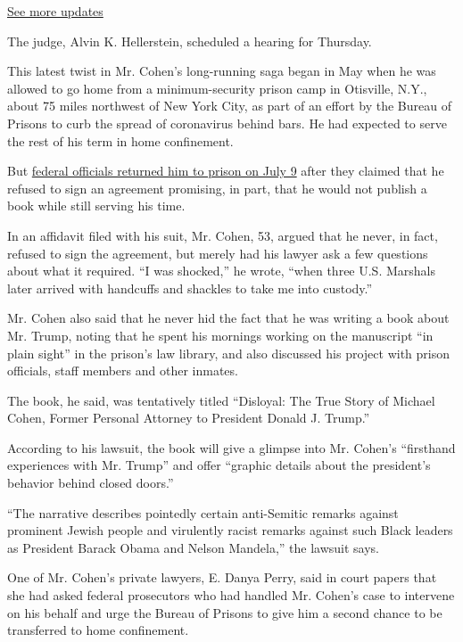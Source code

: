 \href{https://www.nytimes3xbfgragh.onion/2020/08/03/us/elections/biden-vs-trump.html?action=click\&pgtype=Article\&state=default\&region=MAIN_CONTENT_1\&context=storylines_live_updates}{See
more updates}

The judge, Alvin K. Hellerstein, scheduled a hearing for Thursday.

This latest twist in Mr. Cohen's long-running saga began in May when he
was allowed to go home from a minimum-security prison camp in Otisville,
N.Y., about 75 miles northwest of New York City, as part of an effort by
the Bureau of Prisons to curb the spread of coronavirus behind bars. He
had expected to serve the rest of his term in home confinement.

But
\href{https://www.nytimes3xbfgragh.onion/2020/07/09/nyregion/michael-cohen-arrested.html}{federal
officials returned him to prison on July 9} after they claimed that he
refused to sign an agreement promising, in part, that he would not
publish a book while still serving his time.

In an affidavit filed with his suit, Mr. Cohen, 53, argued that he
never, in fact, refused to sign the agreement, but merely had his lawyer
ask a few questions about what it required. ``I was shocked,'' he wrote,
``when three U.S. Marshals later arrived with handcuffs and shackles to
take me into custody.''

Mr. Cohen also said that he never hid the fact that he was writing a
book about Mr. Trump, noting that he spent his mornings working on the
manuscript ``in plain sight'' in the prison's law library, and also
discussed his project with prison officials, staff members and other
inmates.

The book, he said, was tentatively titled ``Disloyal: The True Story of
Michael Cohen, Former Personal Attorney to President Donald J. Trump.''

According to his lawsuit, the book will give a glimpse into Mr. Cohen's
``firsthand experiences with Mr. Trump'' and offer ``graphic details
about the president's behavior behind closed doors.''

``The narrative describes pointedly certain anti-Semitic remarks against
prominent Jewish people and virulently racist remarks against such Black
leaders as President Barack Obama and Nelson Mandela,'' the lawsuit
says.

One of Mr. Cohen's private lawyers, E. Danya Perry, said in court papers
that she had asked federal prosecutors who had handled Mr. Cohen's case
to intervene on his behalf and urge the Bureau of Prisons to give him a
second chance to be transferred to home confinement.

